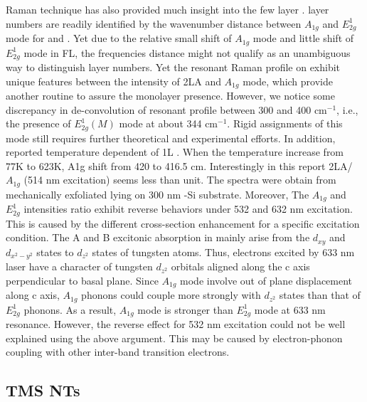 Raman technique has also provided much insight into the few layer .  layer numbers are readily identified by the wavenumber distance between $A_{1g}$ and $E_{2g}^1$ mode for \cite{Buscema2013} and \cite{Berkdemir2013}. Yet due to the relative small shift of $A_{1g}$ mode and little shift of $E_{2g}^1$ mode in  FL, the frequencies distance might not qualify as an unambiguous way to distinguish layer numbers. Yet the resonant Raman profile on  exhibit unique features between the intensity of 2LA and $A_{1g}$ mode,\cite{Berkdemir2013,Zhao2013} which provide another routine to assure the monolayer presence. However, we notice some discrepancy in de-convolution of  resonant profile between 300 and 400 cm$^{-1}$, i.e., the presence of $E_{2g}^1(M)$ mode at about 344 cm$^{-1}$.\cite{Peimyoo2013,Cong2013,Berkdemir2013} Rigid assignments of this mode still requires further theoretical\cite{Ataca2012} and experimental efforts. In addition, \citeauthor{M2013} reported temperature dependent of 1L .\cite{M2013} When the temperature increase from 77K to 623K, A1g shift from 420 to 416.5 cm. Interestingly in this report 2LA/$A_{1g}$ (514 nm excitation) seems less than unit. The spectra were obtain from mechanically exfoliated  lying on 300 nm -Si substrate. Moreover, The $A_{1g}$ and $E_{2g}^1$ intensities ratio exhibit reverse behaviors under 532 and 632 nm excitation. This is caused by the different cross-section enhancement for a specific excitation condition. The A and B excitonic absorption in  mainly arise from the $d_{xy}$ and $d_{x^2 - y^2}$ states to $d_{z^2}$ states of tungsten atoms. Thus, electrons excited by 633 nm laser have a character of tungsten $d_{z^2}$ orbitals aligned along the c axis perpendicular to  basal plane. Since $A_{1g}$ mode involve out of plane displacement along c axis, $A_{1g}$ phonons could couple more strongly with $d_{z^2}$ states than that of $E_{2g}^1$ phonons. As a result, $A_{1g}$ mode is stronger than $E_{2g}^1$ mode at 633 nm resonance.\cite{Zhao2013} However, the reverse effect for 532 nm excitation could not be well explained using the above argument. This may be caused by electron-phonon coupling with other inter-band transition electrons.

\subsection{TMS NTs}\label{sec:ntram}

